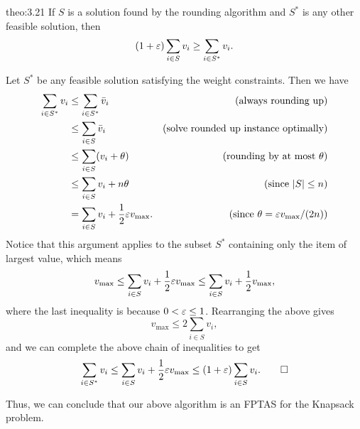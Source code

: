 \begin{theo}{theo:3.21}
    If $S$ is a solution found by the rounding algorithm and $S^*$ is 
    any other feasible solution, then 
    \[ (1 + \varepsilon) \sum_{i\in S} v_i \geq \sum_{i\in S^*} v_i. \] 
\end{theo}
\begin{pf}
    Let $S^*$ be any feasible solution satisfying the weight constraints. 
    Then we have 
    \begin{align*}
        \sum_{i\in S^*} v_i 
        &\leq \sum_{i\in S^*} \bar{v}_i & \text{(always rounding up)} \\ 
        &\leq \sum_{i\in S} \bar{v}_i & \text{(solve rounded up instance optimally)} \\ 
        &\leq \sum_{i\in S} (v_i + \theta) & \text{(rounding by at most $\theta$)} \\ 
        &\leq \sum_{i\in S} v_i + n\theta & \text{(since $|S| \leq n$)} \\ 
        &= \sum_{i\in S} v_i + \frac12 \varepsilon v_{\max}. & \text{(since $\theta = \varepsilon v_{\max}/(2n)$)}
    \end{align*}
    Notice that this argument applies to the subset $S^*$ 
    containing only the item of largest value, which means 
    \[ v_{\max} \leq \sum_{i \in S} v_i + \frac12 \varepsilon v_{\max} \leq 
    \sum_{i\in S} v_i + \frac12 v_{\max}, \] 
    where the last inequality is because $0 < \varepsilon \leq 1$. Rearranging 
    the above gives 
    \[ v_{\max} \leq 2 \sum_{i\in S} v_i, \] 
    and we can complete the above chain of inequalities to get 
    \[ \sum_{i\in S^*} v_i \leq \sum_{i\in S} v_i + \frac12 \varepsilon v_{\max} 
    \leq (1 + \varepsilon) \sum_{i\in S} v_i. \qedhere \] 
\end{pf}

Thus, we can conclude that our above algorithm is an FPTAS for the 
{\sc Knapsack} problem. 
